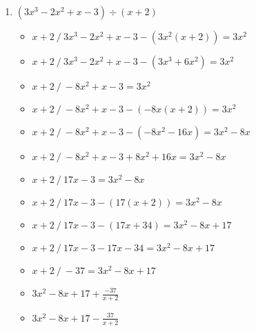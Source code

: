 \documentclass{article}
\begin{document}
\begin{onehalfspace}
\begin{enumerate}
    \item $(3x^{3} - 2x^{2} + x - 3) \div (x + 2)$
    \begin{itemize}
        \item $x + 2 \ / \ 3x^{3} - 2x^{2} + x - 3 - (3x^{2}(x + 2))= 3x^{2}$
        \item $x + 2 \ / \ 3x^{3} - 2x^{2} + x - 3 - (3x^{3} + 6x^{2})= 3x^{2}$
        \item $x + 2 \ / \ - 8x^{2} + x - 3 = 3x^{2}$
        \item $x + 2 \ / \ - 8x^{2} + x - 3 - (-8x(x + 2)) = 3x^{2}$
        \item $x + 2 \ / \ - 8x^{2} + x - 3 - (-8x^{2} - 16x) = 3x^{2} - 8x$
        \item $x + 2 \ / \ - 8x^{2} + x - 3 + 8x^{2} + 16x = 3x^{2} - 8x$
        \item $x + 2 \ / \ 17x - 3 = 3x^{2} - 8x$
        \item $x + 2 \ / \ 17x - 3 - (17(x + 2)) = 3x^{2} - 8x$
        \item $x + 2 \ / \ 17x - 3 - (17x + 34) = 3x^{2} - 8x + 17$
        \item $x + 2 \ / \ 17x - 3 - 17x - 34 = 3x^{2} - 8x + 17$
        \item $x + 2 \ / \ -37 = 3x^{2} - 8x + 17$
        \item $3x^{2} - 8x + 17 + \frac{-37}{x + 2}$
        \item $3x^{2} - 8x + 17 - \frac{37}{x + 2}$
    \end{itemize}


\end{enumerate}
\end{onehalfspace}
\end{document}
